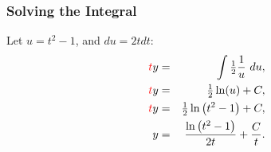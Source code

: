 %
%
%
%


\begin{frame}
  \frametitle{Solving the Integral}

  Let $u=t^2-1$, and $du=2tdt$:
  \begin{eqnarray*}
    {\color{red}t}y & = & \int \mbox{$\frac{1}{2}$} \frac{1}{u} ~ du, \\
    {\color{red}t} y & = & \mbox{$\frac{1}{2}$} \ln(u) + C, \\
    {\color{red}t} y & = & \mbox{$\frac{1}{2}$} \ln \left( t^2 - 1 \right) + C, \\
    y & = & \frac{\ln\left( t^2-1 \right)}{2t} + \frac{C}{t}.
  \end{eqnarray*}

\end{frame}


